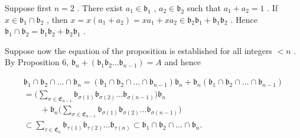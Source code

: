 Suppose first \(n = 2\) . There exist \(a_1 \in \mathfrak{b}_1\) , \(a_2 \in \mathfrak{b}_2\) such that \(a_1 + a_2 = 1\) . If \(x \in \mathfrak{b}_1 \cap \mathfrak{b}_2\) , then \(x = x(a_1 + a_2) = xa_1 + xa_2 \in \mathfrak{b}_2\mathfrak{b}_1 + \mathfrak{b}_1\mathfrak{b}_2\) . Hence \(\mathfrak{b}_1 \cap \mathfrak{b}_2 = \mathfrak{b}_1\mathfrak{b}_2 + \mathfrak{b}_2\mathfrak{b}_1\) .

Suppose now the equation of the proposition is established for all integers \(<n\) . By Proposition 6, \(\mathfrak{b}_{n} + (\mathfrak{b}_{1}\mathfrak{b}_{2}\ldots \mathfrak{b}_{n - 1}) = A\) and hence

\[
\begin{array}{l} \mathfrak {b} _ {1} \cap \mathfrak {b} _ {2} \cap \dots \cap \mathfrak {b} _ {n} = (\mathfrak {b} _ {1} \cap \mathfrak {b} _ {2} \cap \dots \cap \mathfrak {b} _ {n - 1}) \mathfrak {b} _ {n} + \mathfrak {b} _ {n} (\mathfrak {b} _ {1} \cap \mathfrak {b} _ {2} \cap \dots \cap \mathfrak {b} _ {n - 1}) \\ = \Big (\sum_ {\sigma \in \mathfrak {E} _ {n - 1}} \mathfrak {b} _ {\sigma (1)} \mathfrak {b} _ {\sigma (2)} \dots \mathfrak {b} _ {\sigma (n - 1)} \Big) \mathfrak {b} _ {n} \\ \qquad + \mathfrak {b} _ {n} \Big (\sum_ {\sigma \in \mathfrak {E} _ {n - 1}} \mathfrak {b} _ {\sigma (1)} \mathfrak {b} _ {\sigma (2)} \dots \mathfrak {b} _ {\sigma (n - 1)} \Big) \\ \subset \sum_ {\tau \in \mathfrak {E} _ {n}} \mathfrak {b} _ {\tau (1)} \mathfrak {b} _ {\tau (2)} \dots \mathfrak {b} _ {\tau (n)} \subset \mathfrak {b} _ {1} \cap \mathfrak {b} _ {2} \cap \dots \cap \mathfrak {b} _ {n}. \end{array}
\]

